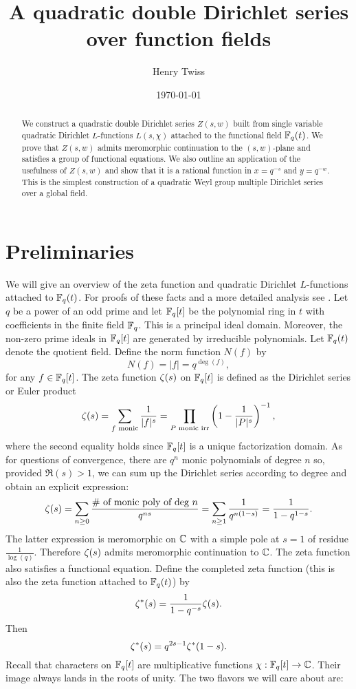 \documentclass[12pt,reqno,oneside]{amsart}
\title{A quadratic double Dirichlet series over function fields}
\author{Henry Twiss}
\date{\today}
\begin{document}
\begin{abstract}
    We construct a quadratic double Dirichlet series $Z(s,w)$ built from single variable quadratic Dirichlet $L$-functions $L(s,\chi)$ attached to the functional field $\mathbb{F}_{q}(t)$. We prove that $Z(s,w)$ admits meromorphic continuation to the $(s,w)$-plane and satisfies a group of functional equations. We also outline an application of the usefulness of $Z(s,w)$ and show that it is a rational function in $x = q^{-s}$ and $y = q^{-w}$. This is the simplest construction of a quadratic Weyl group multiple Dirichlet series over a global field.
\end{abstract}

\maketitle

\section{Preliminaries}
    We will give an overview of the zeta function and quadratic Dirichlet $L$-functions attached to $\mathbb{F}_{q}(t)$. For proofs of these facts and a more detailed analysis see \cite{R}. Let $q$ be a power of an odd prime and let $\mathbb{F}_{q}[t]$ be the polynomial ring in $t$ with coefficients in the finite field $\mathbb{F}_{q}$. This is a principal ideal domain. Moreover, the non-zero prime ideals in $\mathbb{F}_{q}[t]$ are generated by irreducible polynomials. Let $\mathbb{F}_{q}(t)$ denote the quotient field. Define the norm function $N(f)$ by
    \[
        N(f) = |f| = q^{\deg(f)},
    \]
    for any $f \in \mathbb{F}_{q}[t]$. The zeta function $\zeta(s)$ on $\mathbb{F}_{q}[t]$ is defined as the Dirichlet series or Euler product
    \[
        \zeta(s) = \sum_{\text{$f$ monic}}\frac{1}{|f|^{s}} = \prod_{\text{$P$ monic irr}}\left(1-\frac{1}{|P|^{s}}\right)^{-1},
    \]
    where the second equality holds since $\mathbb{F}_{q}[t]$ is a unique factorization domain. As for questions of convergence, there are $q^{n}$ monic polynomials of degree $n$ so, provided $\Re(s) > 1$, we can sum up the Dirichlet series according to degree and obtain an explicit expression:
    \[
        \zeta(s) = \sum_{n \ge 0}\frac{\text{\# of monic poly of deg $n$}}{q^{ns}} = \sum_{n \ge 1}\frac{1}{q^{n(1-s)}} = \frac{1}{1-q^{1-s}}.
    \]
    The latter expression is meromorphic on $\mathbb{C}$ with a simple pole at $s = 1$ of residue $\frac{1}{\log(q)}$. Therefore $\zeta(s)$ admits meromorphic continuation to $\mathbb{C}$. The zeta function also satisfies a functional equation. Define the completed zeta function (this is also the zeta function attached to $\mathbb{F}_{q}(t)$) by
    \[
        \zeta^{\ast}(s) = \frac{1}{1-q^{-s}}\zeta(s).
    \]
    Then
    \[
        \zeta^{\ast}(s) = q^{2s-1}\zeta^{\ast}(1-s).
    \]
    Recall that characters on $\mathbb{F}_{q}[t]$ are multiplicative functions $\chi:\mathbb{F}_{q}[t] \to \mathbb{C}$. Their image always lands in the roots of unity. The two flavors we will care about are:
    
\end{document}
